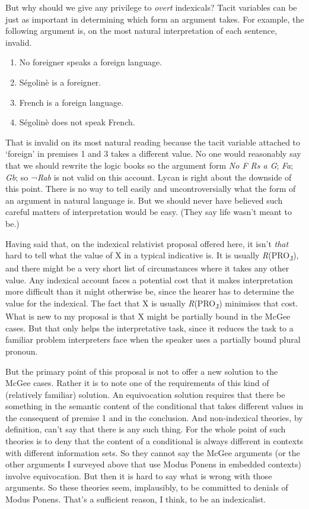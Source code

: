 \documentclass[
  10pt,
  letterpaper,
  DIV=11,
  numbers=noendperiod,
  twoside]{scrartcl}
\providecommand{\tightlist}{%
  \setlength{\itemsep}{0pt}\setlength{\parskip}{0pt}}\usepackage{longtable,booktabs,array}
\begin{document}
But why should we give any privilege to \emph{overt} indexicals? Tacit
variables can be just as important in determining which form an argument
takes. For example, the following argument is, on the most natural
interpretation of each sentence, invalid.

\begin{enumerate}
\def\labelenumi{\arabic{enumi}.}
\tightlist
\item
  No foreigner speaks a foreign language.
\item
  Ségolinè is a foreigner.
\item
  French is a foreign language.
\item
  Ségolinè does not speak French.
\end{enumerate}

That is invalid on its most natural reading because the tacit variable
attached to `foreign' in premises 1 and 3 takes a different value. No
one would reasonably say that we should rewrite the logic books so the
argument form \emph{No F Rs a G}; \emph{Fa}; \emph{Gb}; so ¬\emph{Rab}
is not valid on this account. Lycan is right about the downside of this
point. There is no way to tell easily and uncontroversially what the
form of an argument in natural language is. But we should never have
believed such careful matters of interpretation would be easy. (They say
life wasn't meant to be.)

Having said that, on the indexical relativist proposal offered here, it
isn't \emph{that} hard to tell what the value of X in a typical
indicative is. It is usually \emph{R}(PRO\textsubscript{J}), and there
might be a very short list of circumstances where it takes any other
value. Any indexical account faces a potential cost that it makes
interpretation more difficult than it might otherwise be, since the
hearer has to determine the value for the indexical. The fact that X is
usually \emph{R}(PRO\textsubscript{J}) minimises that cost. What is new
to my proposal is that X might be partially bound in the McGee cases.
But that only helps the interpretative task, since it reduces the task
to a familiar problem interpreters face when the speaker uses a
partially bound plural pronoun.

But the primary point of this proposal is not to offer a new solution to
the McGee cases. Rather it is to note one of the requirements of this
kind of (relatively familiar) solution. An equivocation solution
requires that there be something in the semantic content of the
conditional that takes different values in the consequent of premise 1
and in the conclusion. And non-indexical theories, by definition, can't
say that there is any such thing. For the whole point of such theories
is to deny that the content of a conditional is always different in
contexts with different information sets. So they cannot say the McGee
arguments (or the other arguments I surveyed above that use Modus Ponens
in embedded contexts) involve equivocation. But then it is hard to say
what is wrong with those arguments. So these theories seem, implausibly,
to be committed to denials of Modus Ponens. That's a sufficient reason,
I think, to be an indexicalist.
\end{document}

